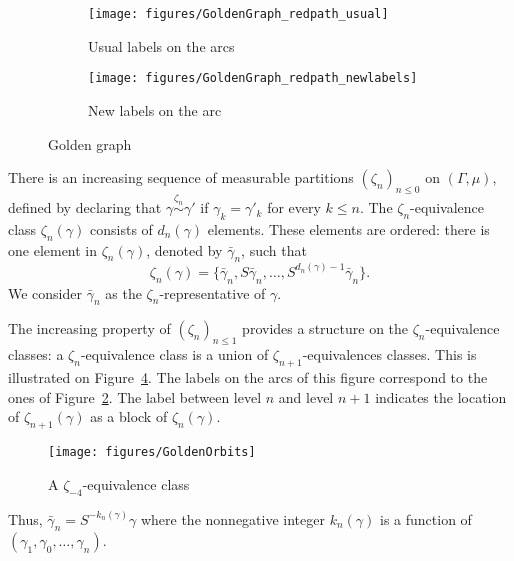 \documentclass[12pt,a4paper]{article}
\begin{document}
\begin{figure}[!h]
   \centering
   \begin{subfigure}[t]{0.37\textwidth}
   \centering
   	\texttt{[image: figures/GoldenGraph\_redpath\_usual]}
 		\caption{\footnotesize Usual labels on the arcs}\label{fig:GoldenGraph}
    \end{subfigure}              
   \quad
    \begin{subfigure}[t]{0.37\textwidth}
    \centering
   	\texttt{[image: figures/GoldenGraph\_redpath\_newlabels]}
 		\caption{\footnotesize New labels on the arc}\label{fig:GoldenGraph_newlabs}
 	\end{subfigure}      

   \caption{Golden graph}
   \label{fig:ostro}
 \end{figure}

There is an increasing sequence of measurable partitions ${(\zeta_n)}_{n \leq 0}$ 
on $(\Gamma, \mu)$, defined by declaring that $\gamma \overset{\zeta_n}{\sim} \gamma'$ 
if $\gamma_k=\gamma'_k$ for every $k \leq n$.  
The $\zeta_n$-equivalence class $\zeta_n(\gamma)$ consists of $d_n(\gamma)$ elements. 
These elements are ordered: there is one element in $\zeta_n(\gamma)$, denoted by 
$\bar\gamma_n$, such that 
$$
\zeta_n(\gamma)= \{\bar\gamma_n, S\bar\gamma_n, \ldots, S^{d_n(\gamma)-1}\bar\gamma_n\}.
$$
We consider $\bar\gamma_n$ as the $\zeta_n$-representative of $\gamma$.



The increasing property of ${(\zeta_n)}_{n \leq 1}$ provides a structure 
on the $\zeta_{n}$-equivalence classes: a $\zeta_n$-equivalence class 
is a union of $\zeta_{n+1}$-equivalences classes. 
This is illustrated on Figure~\ref{fig:GoldenOrbits}. 
The labels on the arcs of this figure correspond to the ones of Figure~\ref{fig:GoldenGraph_newlabs}. 
The label between level $n$ and level $n+1$ indicates the location of 
$\zeta_{n+1}(\gamma)$ as a block of $\zeta_n(\gamma)$. 

\begin{figure}[!h]
\centering
\texttt{[image: figures/GoldenOrbits]}
\caption{A $\zeta_{-4}$-equivalence class}
\label{fig:GoldenOrbits}
\end{figure}

Thus, $\bar\gamma_n = S^{-k_n(\gamma)}\gamma$ where the nonnegative integer $k_n(\gamma)$ 
is a function of $(\gamma_{1}, \gamma_0, \ldots, \gamma_n)$. 
\end{document}
